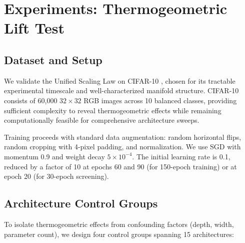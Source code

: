 
\section{Experiments: Thermogeometric Lift Test}
\label{sec:experiments}

\subsection{Dataset and Setup}
\label{sec:dataset_setup}

We validate the Unified Scaling Law on CIFAR-10 \citep{cifar10}, chosen for its 
tractable experimental timescale and well-characterized manifold structure. 
CIFAR-10 consists of 60,000 $32\times32$ RGB images across 10 balanced classes, 
providing sufficient complexity to reveal thermogeometric effects while remaining 
computationally feasible for comprehensive architecture sweeps.

Training proceeds with standard data augmentation: random horizontal flips, 
random cropping with 4-pixel padding, and normalization. We use SGD with momentum 
0.9 and weight decay $5\times10^{-4}$. The initial learning rate is 0.1, 
reduced by a factor of 10 at epochs 60 and 90 (for 150-epoch training) or 
at epoch 20 (for 30-epoch screening).

\subsection{Architecture Control Groups}
\label{sec:control_groups}

To isolate thermogeometric effects from confounding factors (depth, width, 
parameter count), we design four control groups spanning 15 architectures:

